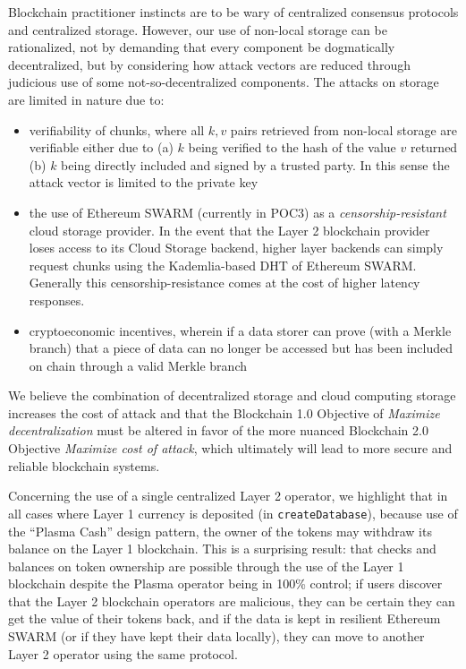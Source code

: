\documentclass{article}
\begin{document}
Blockchain practitioner instincts are to be wary of centralized consensus protocols and centralized storage.  However, our use of non-local storage can be rationalized, not by demanding that every component be  dogmatically decentralized, but by considering how attack vectors are reduced through judicious use of some not-so-decentralized components.  The attacks on storage are limited in nature due to:
\begin{itemize}
\item verifiability of chunks, where all $k,v$ pairs retrieved from non-local storage are verifiable either due to (a) $k$ being verified to the hash of the value $v$ returned (b) $k$ being directly included and signed by a trusted party.  In this sense the attack vector is limited to the private key
\item the use of Ethereum SWARM (currently in POC3) as a {\em censorship-resistant} cloud storage provider.  In the event that the Layer 2 blockchain provider loses access to its Cloud Storage backend, higher layer backends can simply request chunks using the Kademlia-based DHT of Ethereum SWARM.  Generally this censorship-resistance comes at the cost of higher latency responses.
\item cryptoeconomic incentives, wherein if a data storer can prove (with a Merkle branch) that a piece of data can no longer be accessed but has been included on chain through a valid Merkle branch
\end{itemize}
We believe the combination of decentralized storage and cloud computing storage increases the cost of attack and that the Blockchain 1.0 Objective of {\em Maximize decentralization} must be altered in favor of the more nuanced Blockchain 2.0 Objective {\em Maximize cost of attack}, which ultimately will lead to more secure and reliable blockchain systems.

Concerning the use of a single centralized Layer 2 operator, we highlight that in all cases where Layer 1 currency is deposited (in \texttt{createDatabase}), because use of the ``Plasma Cash'' design pattern, the owner of the tokens may withdraw its balance on the Layer 1 blockchain.  This is a surprising result: that checks and balances on token ownership are possible through the use of the Layer 1 blockchain despite the Plasma operator being in 100\% control; if users discover that the Layer 2 blockchain operators are malicious, they can be certain they can get the value of their tokens back, and if the data is kept in resilient Ethereum SWARM (or if they have kept their data locally), they can move to another Layer 2 operator using  the same protocol.
\end{document}
